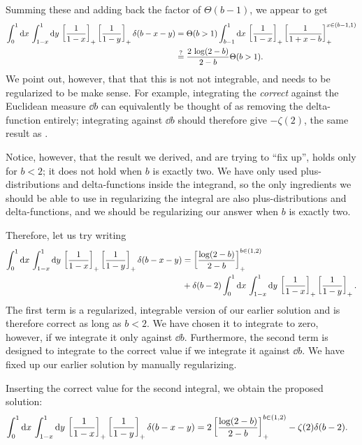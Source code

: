 Summing these and adding back the factor of \(\Theta(b-1)\), we appear to get
\begin{align}
    \int_{0}^{1} \dd x\,
    \int_{1-x}^{1} \dd y\,
    \left[\frac{1}{1-x}\right]_+
    \left[\frac{1}{1-y}\right]_+
    \delta(b - x - y)
    &=
    \Theta(b > 1)
    \int_{b-1}^{1} \dd x\,
    \left[\frac{1}{1 - x}\right]_+
    \left[\frac{1}{1 + x - b}\right]_+^{x\in(b-1,1)}
    \\
    &\overset{?}{=}
    \frac{2\,\log(2-b)}{2 - b}
    \Theta(b > 1)
    \notag
    .
\end{align}
%
We point out, however, that that this is not not integrable, and needs to be regularized to be make sense.
%
For example, integrating the \textit{correct} against the Euclidean measure \(\dd b\) can equivalently be thought of as removing the delta-function entirely;
%
integrating against \(\dd b\) should therefore give \(-\zeta(2)\), the same result as .

Notice, however, that the result we derived, and are trying to ``fix up'', holds only for \(b < 2\);
%
it does not hold when \(b\) is exactly two.
%
We have only used plus-distributions and delta-functions inside the integrand, so the only ingredients we should be able to use in regularizing the integral are also plus-distributions and delta-functions, and we should be regularizing our answer when \(b\) is exactly two.

Therefore, let us try writing
\begin{align}
    \int_{0}^{1} \dd x\,
    \int_{1-x}^{1} \dd y\,
    \left[\frac{1}{1-x}\right]_+
    \left[\frac{1}{1-y}\right]_+
    \delta(b - x - y)
    &=
    \left[\frac{\log(2-b)}{2 - b}\right]_+^{b\in(1,2)}
    \\
    &
    \notag
    +
    \delta(b - 2)
    \int_{0}^{1} \dd x\,
    \int_{1-x}^{1} \dd y\,
    \left[\frac{1}{1-x}\right]_+
    \left[\frac{1}{1-y}\right]_+
    .
\end{align}
The first term is a regularized, integrable version of our earlier solution and is therefore correct as long as \(b < 2\).
%
We have chosen it to integrate to zero, however, if we integrate it only against \(\dd b\).
%
Furthermore, the second term is designed to integrate to the correct value if we integrate it against \(\dd b\).
%
We have fixed up our earlier solution by manually regularizing.

Inserting the correct value for the second integral, we obtain the proposed solution:
\begin{align}
    \int_{0}^{1} \dd x\,
    \int_{1-x}^{1} \dd y\,
    \left[\frac{1}{1-x}\right]_+
    \left[\frac{1}{1-y}\right]_+
    \delta(b - x - y)
    &=
    2 \left[\frac{\log(2-b)}{2 - b}\right]_+^{b\in(1,2)}
    -
    \zeta(2)\delta(b - 2)
    .
\end{align}


